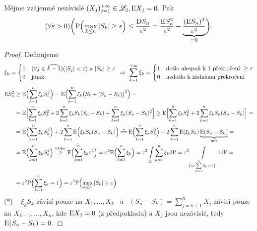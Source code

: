\begin{lemma} \label{kolmner}
	Mějme vzájemně nezávislé $(X_j)_{j=1}^{+\infty}\in\mathscr{L}_2,$\newline$\mathrm{E} X_j=0$. Pak\newline $$(\forall\varepsilon>0)\biggl( \mathrm{P}\Bigl(\max\limits_{k\leq n}|S_k|\geq\varepsilon\Bigr)\leq \frac{\mathrm{D} S_n}{\varepsilon^2}=\frac{\mathrm{E} S_n^2}{\varepsilon^2}-\underbrace{\frac{(\mathrm{E} S_n)^2}{\varepsilon^2}}_{=0} \biggr).$$
	\begin{proof}
		Definujeme $$ \xi_k=\begin{cases}
		1 &(\forall j\in\widehat{k-1})(|S_j|<\varepsilon)\text{ a }|S_k|\geq \varepsilon \\ 0 &\text{jinak}
		\end{cases}~\Rightarrow~\sum\limits_{k=1}^{+\infty}\xi_k=\begin{cases}
		1 &\text{došlo alespoň k 1 překročení }\geq \varepsilon\\0 &\text{nedošlo k žádnému překročení}
		\end{cases} $$
		\[
		\begin{split}
		\E S_n^2 &\geq \E \Bigl( \suminftykn\xi_k S_n^2 \Bigr)=\E \Bigl( \suminftykn\xi_k \bigl(S_k+(S_n-S_k)\bigr)^2 \Bigr)= \\ 
		&= \E \Bigl[ \suminftykn\xi_k S_k^2 +2\suminftykn\xi_k S_k(S_n-S_k)+\suminftykn\xi_k(S_n-S_k)^2 \Bigr]\geq \E \Bigl[ \suminftykn\xi_k S_k^2 +2\suminftykn\xi_k S_k(S_n-S_k) \Bigr]= \\ 
		&=
		\E \Bigl( \suminftykn\xi_k S_k^2\Bigr) +2\suminftykn \E \Bigl(\xi_k S_k(S_n-S_k) \Bigr)\equal{*}	\E \Bigl( \suminftykn\xi_k S_k^2\Bigr)+2\suminftykn \E (\xi_k S_k)\underbrace{\E (S_n-S_k)}_{=0} = \\ 
		&= 
		\E \Bigl( \suminftykn\xi_k S_k^2\Bigr)\stackrel{\forall k\in\hat{n}}{\geq} \E \Bigl( \suminftykn\xi_k \epsilon^2\Bigr)=\epsilon^2 \E \Bigl( \suminftykn\xi_k \Bigr)=\epsilon^2 \int\limits_{\Omega} \suminftykn\xi_k\dif\PP=\epsilon^2\int\limits_{\{ \omega:\suminftykn\xi_k=1 \}}1\dif\PP=\\ 
		&= \epsilon^2 \PP\Bigl( \suminftykn\xi_k=1 \Bigr)=\epsilon^2 \PP\Bigl( \max\limits_{k\leq n}|S_k|\geq \epsilon \Bigr)
		\end{split}
		\]
		($\ast $) ~ $\xi_k S_k$ závisí pouze na $X_1,...,X_k$ ~a~ $(S_n-S_k)=\sum\limits_{j=k+1}^nX_j$ závisí pouze na $X_{k+1},...,X_n$, kde $\mathrm{E} X_j=0$ (z předpokladu) a $X_j$ jsou nezávislé,
		tedy $\mathrm{E} (S_n-S_k)=0$.
	\end{proof}
\end{lemma}
